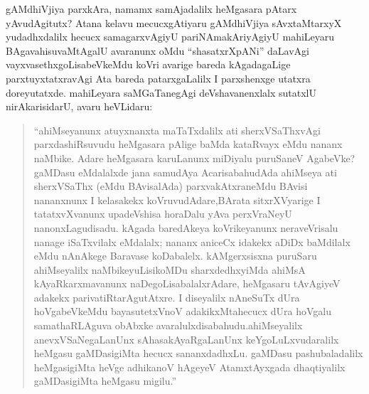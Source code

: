 gAMdhiVjiya parxkAra, namamx samAjadalilx heMgasara pAtarx yAvudAgitutx? Atana kelavu mecucxgAtiyaru gAMdhiVjiya sAvxtaMtarxyX yudadhxdalilx hecucx samagarxvAgiyU pariNAmakAriyAgiyU mahiLeyaru BAgavahisuvaMtAgalU avaranunx oMdu ``shasatxrXpANi'' daLavAgi vayxvasethxgoLisabeVkeMdu koVri avarige bareda kAgadagaLige parxtuyxtatxravAgi Ata bareda patarxgaLalilx I parxshenxge utatxra doreyutatxde. mahiLeyara saMGaTanegAgi deVshavanenxlalx sutatxlU nirAkarisidarU, avaru heVLidaru:
\begin{quote}
``ahiMseyanunx atuyxnanxta maTaTxdalilx ati sherxVSaThxvAgi parxdashiRsuvudu heMgasara pAlige baMda kataRvayx eMdu nananx naMbike. Adare heMga\-sara karuLanunx miDiyalu puruSaneV AgabeVke? gaMDasu eMdalalxde jana samudAya AcarisabahudAda ahiMseya ati sherxVSaThx (eMdu BAvisa\-lAda) parxvakAtxraneMdu BAvisi nananxnunx I kelasakekx koVruvu\-dAdare,\break BArata sitxrXVyarige I tatatxvXvanunx upadeVshisa horaDalu yAva perxVra\-NeyU nanonxLagudisadu. kAgada baredAkeya koVrikeyanunx nera\-veVrisalu nanage iSaTxvilalx eMdalalx; nananx aniceCx idakekx aDiDx \hbox{baMdilalx} eMdu nAnAkege Baravase koDabalelx. kAMgerxsisxna puruSaru ahiMseyalilx naMbikeyuLisikoMDu sharxdedhxyiMda ahiMsA kAyaRkarxmavanunx naDe\-goLisabalalxrAdare, heMgasaru tAvAgiyeV adakekx parivatiRtarAgutAtxre. I diseyalilx nAneSuTx dUra hoVgabeVkeMdu bayasutetxVnoV adakikxMta\break hecucx dUra hoVgalu samathaRLAguva obAbxke avaralulxdisabahudu.\break ahiMseyalilx anevxVSaNegaLanUnx sAhasakAyaRgaLanUnx keYgoLuLxvuda\break\-ralilx heMgasu gaMDasigiMta hecucx sananxdadhxLu. gaMDasu pashubaladalilx heMgasi\-giMta heVge adhikanoV hAgeyeV AtamxtAyxgada dhaqtiyalilx gaMDasigiMta heMgasu migilu.''
\end{quote}

